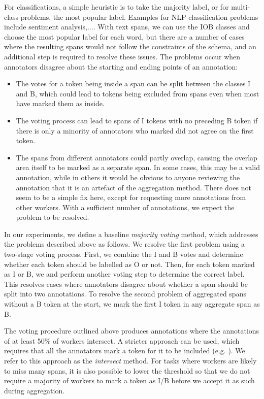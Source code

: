 For classifications, a simple heuristic is to take the majority label, or for multi-class problems, the most popular label. Examples for NLP classification problems include sentiment analysis\cite{sayeed2011crowdsourcing},.... With text spans, we can use the IOB classes and choose the most popular label for each word, but there are a number of cases where the resulting spans would not follow the constraints of the schema, and an additional step is required to resolve these issues. The problems occur when annotators disagree about the starting and ending points of an annotation:
\begin{itemize}
  \item The votes for a token being inside a span can be split between the classes I and B, which could lead to tokens being excluded from spans even when most have marked them as inside. 
  \item The voting process can lead to spans of I tokens with no preceding B token if there is only a minority of annotators who marked did not agree on the first token. 
  \item The spans from different annotators could partly overlap, causing the overlap area itself to be marked as a separate span. In some cases, this may be a valid annotation, while in others it would be obvious to anyone reviewing the annotation that it is an artefact of the aggregation method. There does not seem to be a simple fix here, except for requesting more annotations from other workers. With a sufficient number of annotations, we expect the problem to be resolved.
\end{itemize}
In our experiments, we define a baseline \emph{majority voting} method, which addresses the problems described above as follows. We resolve the first problem using a two-stage voting process. First, we combine the I and B votes and determine whether each token should be labelled as O or not. Then, for each token marked as I or B, we and perform another voting step to determine the correct label. This resolves cases where annotators disagree about whether a span should be split into two annotations. To resolve the second problem of aggregated spans without a B token at the start, we mark the first I token in any aggregate span as B.  

The voting procedure outlined above produces annotations where the annotations of at least 50\% of workers intersect. A stricter approach can be used, which requires that all the annotators mark a token for it to be included (e.g. \cite{farra2015annotating}). We refer to this approach as the \emph{intersect} method. For tasks where workers are likely to miss many spans, it is also possible to lower the threshold so that we do not require a majority of workers to mark a token as I/B before we accept it as such during aggregation.

